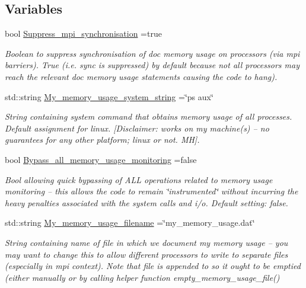 \subsection*{Variables}
\begin{DoxyCompactItemize}
\item 
bool \hyperlink{namespaceoomph_1_1MemoryUsage_a77ed83cae1c77e9a046bc6b1ff55645a}{Suppress\+\_\+mpi\+\_\+synchronisation} =true
\begin{DoxyCompactList}\small\item\em Boolean to suppress synchronisation of doc memory usage on processors (via mpi barriers). True (i.\+e. sync is suppressed) by default because not all processors may reach the relevant doc memory usage statements causing the code to hang). \end{DoxyCompactList}\item 
std\+::string \hyperlink{namespaceoomph_1_1MemoryUsage_ae5280b46bc1ce506ba96494d6dacbdbe}{My\+\_\+memory\+\_\+usage\+\_\+system\+\_\+string} =\char`\"{}ps aux\char`\"{}
\begin{DoxyCompactList}\small\item\em String containing system command that obtains memory usage of all processes. Default assignment for linux. \mbox{[}Disclaimer\+: works on my machine(s) -- no guarantees for any other platform; linux or not. MH\mbox{]}. \end{DoxyCompactList}\item 
bool \hyperlink{namespaceoomph_1_1MemoryUsage_a1b52934e2d3ddd6779f5f9581d14abc1}{Bypass\+\_\+all\+\_\+memory\+\_\+usage\+\_\+monitoring} =false
\begin{DoxyCompactList}\small\item\em Bool allowing quick bypassing of A\+LL operations related to memory usage monitoring -- this allows the code to remain \char`\"{}instrumented\char`\"{} without incurring the heavy penalties associated with the system calls and i/o. Default setting\+: false. \end{DoxyCompactList}\item 
std\+::string \hyperlink{namespaceoomph_1_1MemoryUsage_aa764cf2d9bfd321a3784aafdd32714bf}{My\+\_\+memory\+\_\+usage\+\_\+filename} =\char`\"{}my\+\_\+memory\+\_\+usage.\+dat\char`\"{}
\begin{DoxyCompactList}\small\item\em String containing name of file in which we document my memory usage -- you may want to change this to allow different processors to write to separate files (especially in mpi context). Note that file is appended to so it ought to be emptied (either manually or by calling helper function empty\+\_\+memory\+\_\+usage\+\_\+file() \end{DoxyCompactList}\item 

\end{DoxyCompactItemize}
